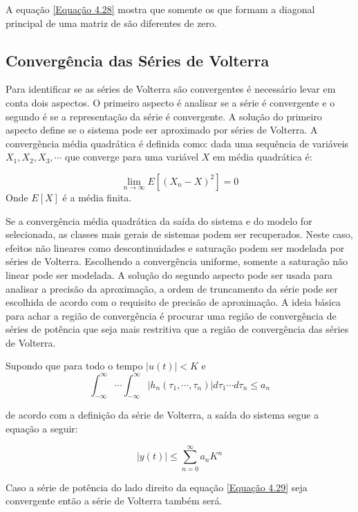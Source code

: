 A equação \ref{Equação 4.28} mostra que somente os  que formam a diagonal principal de uma matriz de  são diferentes de zero.\cite{cheng2017volterra}

\subsection*{Convergência das Séries de Volterra}
Para identificar se as séries de Volterra são convergentes é necessário levar em conta dois aspectos. O primeiro aspecto é analisar se a série é convergente e o segundo é se a representação da série é convergente. A solução do primeiro aspecto define se o sistema pode ser aproximado por séries de Volterra. A convergência média quadrática é definida como: dada uma sequência de variáveis $X_{1}, X_{2},X_{3},\cdots$ que converge para uma variável $X$ em média quadrática é:

\begin{equation}
\lim\limits_{n \rightarrow \infty} E[(X_{n} - X)^{2}] = 0
\end{equation} 
Onde $E[X]$ é a média finita.

Se a convergência média quadrática da saída do sistema e do modelo for selecionada, as classes mais gerais de sistemas podem ser recuperados. Neste caso, efeitos não lineares como descontinuidades e saturação podem ser modelada por séries de Volterra. Escolhendo a convergência uniforme, somente a saturação não linear pode ser modelada. A solução do segundo aspecto pode ser usada para analisar a precisão da aproximação, a ordem de truncamento da série pode ser escolhida de acordo com o requisito de precisão de aproximação. A ideia básica para achar a região de convergência é procurar uma região de convergência de séries de potência que seja mais restritiva que a região de convergência das séries de Volterra.

Supondo que para todo o tempo
$|u(t)| < K$ e $$\int_{-\infty}^{\infty} \cdots\int_{-\infty}^{\infty} |h_{n}(\tau_{1},\cdots,\tau_{n})| d\tau_{1}\cdots d\tau_{n} \leq a_{n}$$

de acordo com a definição da série de Volterra, a saída do sistema segue a equação a seguir:

\begin{equation}
|y(t)| \leq \sum_{n = 0}^{\infty}a_{n}K^{n}
\label{Equação 4.29}
\end{equation}

Caso a série de potência do lado direito da equação \ref{Equação 4.29} seja convergente então a série de Volterra também será.

